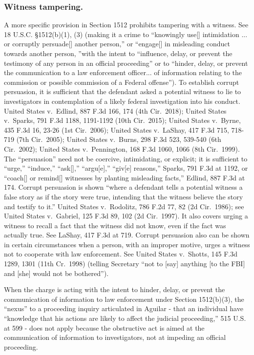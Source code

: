 \subsubsection*{Witness tampering.}
A more specific provision in Section 1512 prohibits tampering with a witness.
See 18 U.S.C. \S 1512(b)(1), (3) (making it a crime to “knowingly use[] intimidation ... or corruptly persuade[] another person,” or “engage[] in misleading conduct towards another person, ”with the intent to “influence, delay, or prevent the testimony of any person in an official proceeding” or to “hinder, delay, or prevent the communication to a law enforcement officer... of information relating to the commission or possible commission of a Federal offense”).
To establish corrupt persuasion, it is sufficient that the defendant asked a potential witness to lie to investigators in contemplation of a likely federal investigation into his conduct.
United States v.\ Edlind, 887 F.3d 166, 174 (4th Cir.~2018);
United States v.\ Sparks, 791 F.3d 1188, 1191-1192 (10th Cir.~2015);
United States v.\ Byrne, 435 F.3d 16, 23-26 (1st Cir.~2006);
United States v.\ LaShay, 417 F.3d 715, 718-719 (7th Cir.~2005);
United States v.\ Burns, 298 F.3d 523, 539-540 (6th Cir.~2002);
United States v.\ Pennington, 168 F.3d 1060, 1066 (8th Cir.~1999).
The “persuasion” need not be coercive, intimidating, or explicit;
it is sufficient to “urge,” “induce,” “ask[],” “argu[e],” “giv[e] reasons,” Sparks, 791 F.3d at 1192, or “coach[] or remind[] witnesses by planting misleading facts,” Edlind, 887 F.3d at 174.
Corrupt persuasion is shown “where a defendant tells a potential witness a false story as if the story were true, intending that the witness believe the story and testify to it.”
United States v.\ Rodolitz, 786 F.2d 77, 82 (2d Cir.~1986);
see United States v.\ Gabriel, 125 F.3d 89, 102 (2d Cir.~1997).
It also covers urging a witness to recall a fact that the witness did not know, even if the fact was actually true.
See LaShay, 417 F.3d at 719.
Corrupt persuasion also can be shown in certain circumstances when a person, with an improper motive, urges a witness not to cooperate with law enforcement.
See United States v.\ Shotts, 145 F.3d 1289, 1301 (11th Cr.~1998) (telling Secretary “not to [say] anything [to the FBI] and [she] would not be bothered”).

When the charge is acting with the intent to hinder, delay, or prevent the communication of information to law enforcement under Section 1512(b)(3), the “nexus” to a proceeding inquiry articulated in Aguilar - that an individual have “knowledge that his actions are likely to affect the judicial proceeding,” 515 U.S. at 599 - does not apply because the obstructive act is aimed at the communication of information to investigators, not at impeding an official proceeding.

